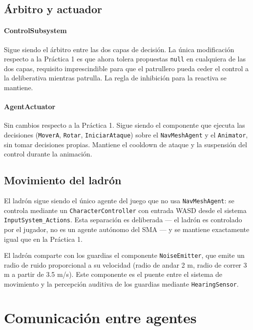 \documentclass[a4paper,12pt]{article}
\begin{document}
\subsection*{Árbitro y actuador}

\paragraph{ControlSubsystem}
Sigue siendo el árbitro entre las dos capas de decisión. La única modificación respecto a la Práctica 1 es que ahora tolera propuestas \texttt{null} en cualquiera de las dos capas, requisito imprescindible para que el patrullero pueda ceder el control a la deliberativa mientras patrulla. La regla de inhibición para la reactiva se mantiene.

\paragraph{AgentActuator}
Sin cambios respecto a la Práctica 1. Sigue siendo el componente que ejecuta las decisiones (\texttt{MoverA}, \texttt{Rotar}, \texttt{IniciarAtaque}) sobre el \texttt{NavMeshAgent} y el \texttt{Animator}, sin tomar decisiones propias. Mantiene el cooldown de ataque y la suspensión del control durante la animación.

\subsection*{Movimiento del ladrón}

El ladrón sigue siendo el único agente del juego que no usa \texttt{NavMeshAgent}: se controla mediante un \texttt{CharacterController} con entrada WASD desde el sistema \texttt{InputSystem\_Actions}. Esta separación es deliberada — el ladrón es controlado por el jugador, no es un agente autónomo del SMA — y se mantiene exactamente igual que en la Práctica 1.

El ladrón comparte con los guardias el componente \texttt{NoiseEmitter}, que emite un radio de ruido proporcional a su velocidad (radio de andar 2 m, radio de correr 3 m a partir de 3.5 m/s). Este componente es el puente entre el sistema de movimiento y la percepción auditiva de los guardias mediante \texttt{HearingSensor}.


\section{Comunicación entre agentes}
\end{document}
